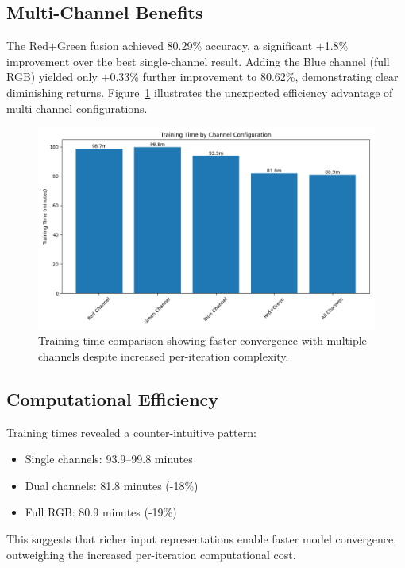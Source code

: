 \documentclass{article} %
\begin{document}
\subsection{Multi-Channel Benefits}
The Red+Green fusion achieved 80.29\% accuracy, a significant +1.8\% improvement over the best single-channel result. Adding the Blue channel (full RGB) yielded only +0.33\% further improvement to 80.62\%, demonstrating clear diminishing returns. Figure~\ref{fig:training} illustrates the unexpected efficiency advantage of multi-channel configurations.

\begin{figure}[t]
    \centering
    \includegraphics[width=0.8\linewidth]{training_time_comparison.png}
    \caption{Training time comparison showing faster convergence with multiple channels despite increased per-iteration complexity.}
    \label{fig:training}
\end{figure}

\subsection{Computational Efficiency}
Training times revealed a counter-intuitive pattern:
\begin{itemize}
    \item Single channels: 93.9--99.8 minutes
    \item Dual channels: 81.8 minutes (-18\%)
    \item Full RGB: 80.9 minutes (-19\%)
\end{itemize}
This suggests that richer input representations enable faster model convergence, outweighing the increased per-iteration computational cost.
\end{document}
